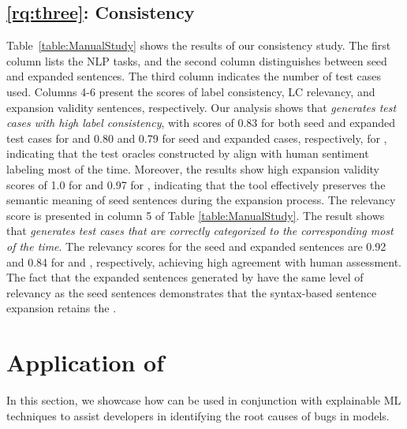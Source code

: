 
\subsection{\ref{rq:three}:  Consistency}


Table~\ref{table:ManualStudy} shows the results of our consistency study. The first column lists the NLP tasks, and the second column distinguishes between seed and expanded sentences. The third column indicates the number of test cases used. Columns 4-6 present the scores of label consistency, LC relevancy, and expansion validity sentences, respectively. Our analysis shows that \emph{\tool generates test cases with high label consistency}, with scores of 0.83 for both seed and expanded test cases for \sa and 0.80 and 0.79 for seed and expanded cases, respectively, for \hsd, indicating that the test oracles constructed by \tool align with human sentiment labeling most of the time.
Moreover, the results show high expansion validity scores of 1.0 for \sa and 0.97 for \hsd, indicating that the tool effectively preserves the semantic meaning of seed sentences during the expansion process. The \lc relevancy score is presented in column 5 of Table \ref{table:ManualStudy}. The result shows that \emph{\tool generates test cases that are correctly categorized to the corresponding \lcs most of the time}. The \lc relevancy scores for the seed and expanded sentences are 0.92 and 0.84 for \sa and \hsd, respectively, achieving high agreement with human assessment. The fact that the expanded sentences generated by \tool have the same level of \lc relevancy as the seed sentences demonstrates that the syntax-based sentence expansion retains the \lcs.












\section{Application of \tool}
\label{sec:application}

In this section, we showcase how \tool can be used in conjunction with explainable ML techniques to assist developers in identifying the root causes of bugs in \sa models.


